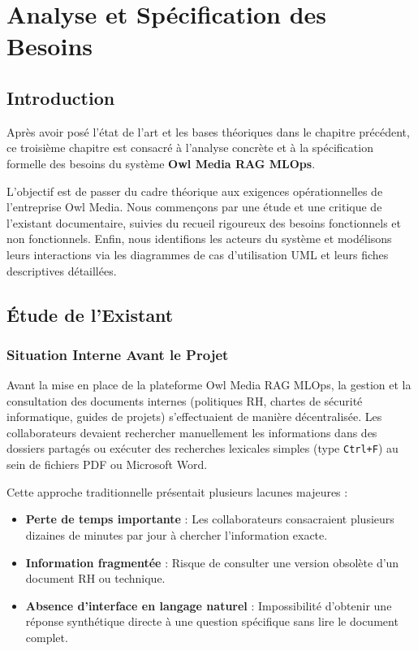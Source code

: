 \chapter{Analyse et Spécification des Besoins}
\label{chap:analyse_besoins}

\section{Introduction}
Après avoir posé l'état de l'art et les bases théoriques dans le chapitre précédent, ce troisième chapitre est consacré à l'analyse concrète et à la spécification formelle des besoins du système \textbf{Owl Media RAG MLOps}. 

L'objectif est de passer du cadre théorique aux exigences opérationnelles de l'entreprise Owl Media. Nous commençons par une étude et une critique de l'existant documentaire, suivies du recueil rigoureux des besoins fonctionnels et non fonctionnels. Enfin, nous identifions les acteurs du système et modélisons leurs interactions via les diagrammes de cas d'utilisation UML et leurs fiches descriptives détaillées.

\section{Étude de l'Existant}

\subsection{Situation Interne Avant le Projet}
Avant la mise en place de la plateforme Owl Media RAG MLOps, la gestion et la consultation des documents internes (politiques RH, chartes de sécurité informatique, guides de projets) s'effectuaient de manière décentralisée. Les collaborateurs devaient rechercher manuellement les informations dans des dossiers partagés ou exécuter des recherches lexicales simples (type \texttt{Ctrl+F}) au sein de fichiers PDF ou Microsoft Word.

Cette approche traditionnelle présentait plusieurs lacunes majeures :
\begin{itemize}
    \item \textbf{Perte de temps importante} : Les collaborateurs consacraient plusieurs dizaines de minutes par jour à chercher l'information exacte.
    \item \textbf{Information fragmentée} : Risque de consulter une version obsolète d'un document RH ou technique.
    \item \textbf{Absence d'interface en langage naturel} : Impossibilité d'obtenir une réponse synthétique directe à une question spécifique sans lire le document complet.
\end{itemize}

